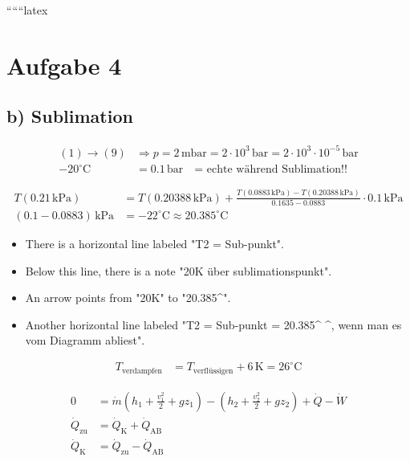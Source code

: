 
``````latex


\section*{Aufgabe 4}

\subsection*{b) Sublimation}

\begin{align*}
    (1) \rightarrow (9) & \Rightarrow p = 2 \, \text{mbar} = 2 \cdot 10^3 \, \text{bar} = 2 \cdot 10^3 \cdot 10^{-5} \, \text{bar} \\
    -20^\circ \text{C} & = 0.1 \, \text{bar} \quad \text{= echte während Sublimation!!}
\end{align*}

\begin{align*}
    T(0.21 \, \text{kPa}) & = T(0.20388 \, \text{kPa}) + \frac{T(0.0883 \, \text{kPa}) - T(0.20388 \, \text{kPa})}{0.1635 - 0.0883} \cdot 0.1 \, \text{kPa} \\
    (0.1 - 0.0883) \, \text{kPa} & = -22^\circ \text{C} \approx 20.385^\circ \text{C}
\end{align*}

\begin{itemize}
    \item There is a horizontal line labeled "T2 = Sub-punkt".
    \item Below this line, there is a note "20K über sublimationspunkt".
    \item An arrow points from "20K" to "20.385^\circ {}".
    \item Another horizontal line labeled "T2 = Sub-punkt = 20.385^\circ {} ^\circ {}, wenn man es vom Diagramm abliest".
\end{itemize}

\begin{align*}
    T_{\text{verdampfen}} & = T_{\text{verflüssigen}} + 6 \, \text{K} = 26^\circ \text{C}
\end{align*}

\begin{align*}
    0 & = \dot{m} \left( h_1 + \frac{v_1^2}{2} + g z_1 \right) - \left( h_2 + \frac{v_2^2}{2} + g z_2 \right) + \dot{Q} - \dot{W} \\
    \dot{Q}_{\text{zu}} & = \dot{Q}_{\text{K}} + \dot{Q}_{\text{AB}} \\
    \dot{Q}_{\text{K}} & = \dot{Q}_{\text{zu}} - \dot{Q}_{\text{AB}}
\end{align*}

